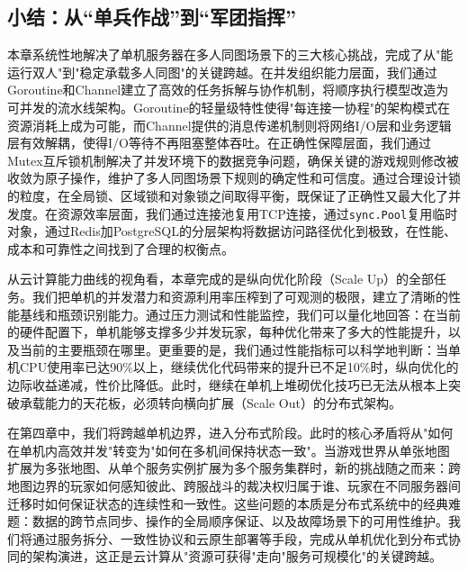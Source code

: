 \subsection{小结：从“单兵作战”到“军团指挥”}

本章系统性地解决了单机服务器在多人同图场景下的三大核心挑战，完成了从"能运行双人"到"稳定承载多人同图"的关键跨越。在并发组织能力层面，我们通过Goroutine和Channel建立了高效的任务拆解与协作机制，将顺序执行模型改造为可并发的流水线架构。Goroutine的轻量级特性使得"每连接一协程"的架构模式在资源消耗上成为可能，而Channel提供的消息传递机制则将网络I/O层和业务逻辑层有效解耦，使得I/O等待不再阻塞整体吞吐。在正确性保障层面，我们通过Mutex互斥锁机制解决了并发环境下的数据竞争问题，确保关键的游戏规则修改被收敛为原子操作，维护了多人同图场景下规则的确定性和可信度。通过合理设计锁的粒度，在全局锁、区域锁和对象锁之间取得平衡，既保证了正确性又最大化了并发度。在资源效率层面，我们通过连接池复用TCP连接，通过\texttt{sync.Pool}复用临时对象，通过Redis加PostgreSQL的分层架构将数据访问路径优化到极致，在性能、成本和可靠性之间找到了合理的权衡点。

从云计算能力曲线的视角看，本章完成的是纵向优化阶段（Scale Up）的全部任务。我们把单机的并发潜力和资源利用率压榨到了可观测的极限，建立了清晰的性能基线和瓶颈识别能力。通过压力测试和性能监控，我们可以量化地回答：在当前的硬件配置下，单机能够支撑多少并发玩家，每种优化带来了多大的性能提升，以及当前的主要瓶颈在哪里。更重要的是，我们通过性能指标可以科学地判断：当单机CPU使用率已达90\%以上，继续优化代码带来的提升已不足10\%时，纵向优化的边际收益递减，性价比降低。此时，继续在单机上堆砌优化技巧已无法从根本上突破承载能力的天花板，必须转向横向扩展（Scale Out）的分布式架构。

在第四章中，我们将跨越单机边界，进入分布式阶段。此时的核心矛盾将从"如何在单机内高效并发"转变为"如何在多机间保持状态一致"。当游戏世界从单张地图扩展为多张地图、从单个服务实例扩展为多个服务集群时，新的挑战随之而来：跨地图边界的玩家如何感知彼此、跨服战斗的裁决权归属于谁、玩家在不同服务器间迁移时如何保证状态的连续性和一致性。这些问题的本质是分布式系统中的经典难题：数据的跨节点同步、操作的全局顺序保证、以及故障场景下的可用性维护。我们将通过服务拆分、一致性协议和云原生部署等手段，完成从单机优化到分布式协同的架构演进，这正是云计算从"资源可获得"走向"服务可规模化"的关键跨越。





